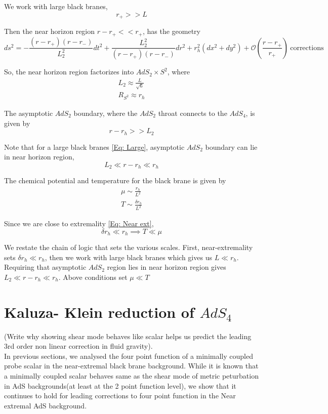 \documentclass[a4paper,11pt]{article}
\begin{document}
We work with large black branes, 
\begin{equation}\label{Eq: Large}
    r_+>>L 
\end{equation}

Then the near horizon region $r-r_+<<r_+$, has the geometry
\begin{equation}
    ds^2= -\frac{(r-r_+)(r-r_-)}{L_2^2}dt^2 + \frac{L_2^2}{(r-r_+)(r-r_-)}dr^2 +r_h^2(dx^2 +dy^2) + \mathcal{O}(\frac{r-r_+}{r_+})\ \text{corrections}
\end{equation}

So, the near horizon region factorizes into $AdS_2 \times S^2$, where
\begin{align}
    L_2 \approx \frac{L}{\sqrt{6}}\\
    R_{S^2} \approx r_h
\end{align}

The asymptotic $AdS_2$ boundary, where the $AdS_2$ throat connects to the $AdS_4$, is given by 
\begin{equation}
    r-r_h>>L_2
\end{equation}

Note that for a large black branes \ref{Eq: Large}, asymptotic $AdS_2$ boundary can lie in near horizon region,
\begin{equation}
    L_2 \ll r-r_h \ll r_h
\end{equation}

The chemical potential and temperature for the black brane is given by
\begin{align}
    \mu \sim \frac{r_h}{L^2} \\
    T\sim \frac{\delta r_h}{L^2}
\end{align}

Since we are close to extremality \ref{Eq: Near ext},
\begin{equation}\label{Eq:T\mu}
    \delta r_h \ll r_h \implies T \ll \mu
\end{equation}

We restate the chain of logic that sets the various scales. First, near-extremality sets $ \delta r_h \ll r_h$, then we work with large black branes which gives us $L\ll r_h$. Requiring that asymptotic $AdS_2$ region lies in near horizon region gives $L_2\ll r-r_h \ll r_h$.
Above conditions set $\mu \ll T$

\section{Kaluza- Klein reduction of $AdS_4$}
(Write why showing shear mode behaves like scalar helps us predict the leading 3rd order non linear correction in fluid gravity).\\
In previous sections, we analysed the four point function of a minimally coupled probe scalar in the near-extremal black brane background. While it is known that a minimally coupled scalar behaves same as the shear mode of metric peturbation in AdS backgrounds(at least at the 2 point function level), we show that it continues to hold for leading corrections to four point function in the Near extremal AdS background.\\
\end{document}
